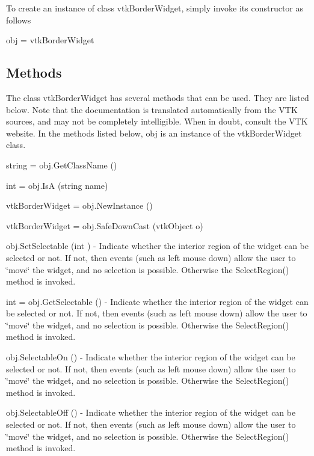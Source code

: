 To create an instance of class vtk\-Border\-Widget, simply invoke its constructor as follows \begin{DoxyVerb}  obj = vtkBorderWidget
\end{DoxyVerb}
 \hypertarget{vtkwidgets_vtkxyplotwidget_Methods}{}\subsection{Methods}\label{vtkwidgets_vtkxyplotwidget_Methods}
The class vtk\-Border\-Widget has several methods that can be used. They are listed below. Note that the documentation is translated automatically from the V\-T\-K sources, and may not be completely intelligible. When in doubt, consult the V\-T\-K website. In the methods listed below, {\ttfamily obj} is an instance of the vtk\-Border\-Widget class. 
\begin{DoxyItemize}
\item {\ttfamily string = obj.\-Get\-Class\-Name ()}  
\item {\ttfamily int = obj.\-Is\-A (string name)}  
\item {\ttfamily vtk\-Border\-Widget = obj.\-New\-Instance ()}  
\item {\ttfamily vtk\-Border\-Widget = obj.\-Safe\-Down\-Cast (vtk\-Object o)}  
\item {\ttfamily obj.\-Set\-Selectable (int )} -\/ Indicate whether the interior region of the widget can be selected or not. If not, then events (such as left mouse down) allow the user to \char`\"{}move\char`\"{} the widget, and no selection is possible. Otherwise the Select\-Region() method is invoked.  
\item {\ttfamily int = obj.\-Get\-Selectable ()} -\/ Indicate whether the interior region of the widget can be selected or not. If not, then events (such as left mouse down) allow the user to \char`\"{}move\char`\"{} the widget, and no selection is possible. Otherwise the Select\-Region() method is invoked.  
\item {\ttfamily obj.\-Selectable\-On ()} -\/ Indicate whether the interior region of the widget can be selected or not. If not, then events (such as left mouse down) allow the user to \char`\"{}move\char`\"{} the widget, and no selection is possible. Otherwise the Select\-Region() method is invoked.  
\item {\ttfamily obj.\-Selectable\-Off ()} -\/ Indicate whether the interior region of the widget can be selected or not. If not, then events (such as left mouse down) allow the user to \char`\"{}move\char`\"{} the widget, and no selection is possible. Otherwise the Select\-Region() method is invoked.  

\end{DoxyItemize}
